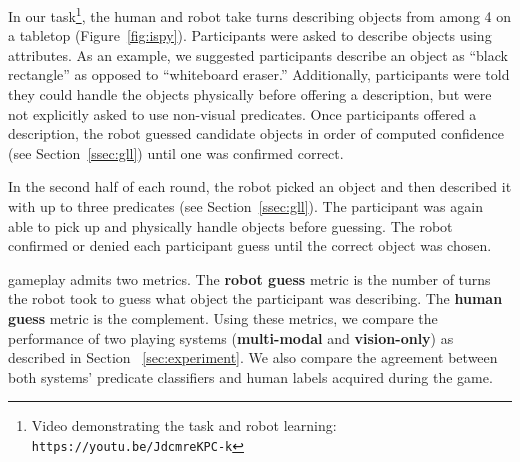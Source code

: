 In our \ispy task\footnote{Video demonstrating the \ispy task and robot learning: \texttt{https://youtu.be/JdcmreKPC-k}}, the human and robot take turns describing objects from among 4 on a tabletop (Figure~\ref{fig:ispy}).
Participants were asked to describe objects using attributes.
As an example, we suggested participants describe an object as ``black rectangle'' as opposed to ``whiteboard eraser.''
Additionally, participants were told they could handle the objects physically before offering a description, but were not explicitly asked to use non-visual predicates.
Once participants offered a description, the robot guessed candidate objects in order of computed confidence (see Section~\ref{ssec:gll}) until one was confirmed correct.

In the second half of each round, the robot picked an object and then described it with up to three predicates (see Section~\ref{ssec:gll}).
The participant was again able to pick up and physically handle objects before guessing.
The robot confirmed or denied each participant guess until the correct object was chosen.

\ispy gameplay admits two metrics.
The \textbf{robot guess} metric is the number of turns the robot took to guess what object the participant was describing.
The \textbf{human guess} metric is the complement.
Using these metrics, we compare the performance of two \ispy playing systems (\textbf{multi-modal} and \textbf{vision-only}) as described in Section ~\ref{sec:experiment}.
We also compare the agreement between both systems' predicate classifiers and human labels acquired during the game.